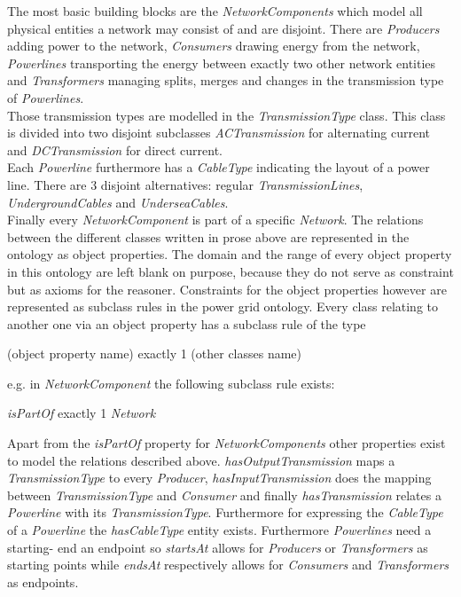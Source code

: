 The most basic building blocks are the \textit{NetworkComponents} which model all physical entities 
a network may consist of and are disjoint. There are \textit{Producers} adding power to the network, \textit{Consumers} drawing energy from the network, \textit{Powerlines} transporting the energy between exactly two other network entities and \textit{Transformers} managing splits, merges and changes in the transmission type of \textit{Powerlines}. \\
Those transmission types are modelled in the \textit{TransmissionType} class. This class is divided into two disjoint subclasses \textit{ACTransmission} for alternating current and \textit{DCTransmission} for direct current. \\
Each \textit{Powerline} furthermore has a \textit{CableType} indicating the layout of a power line. There are 3 disjoint alternatives: regular \textit{TransmissionLines}, \textit{UndergroundCables} and \textit{UnderseaCables}. \\
Finally every \textit{NetworkComponent} is part of a specific \textit{Network}.
The relations between the different classes written in prose above are represented in the ontology
as object properties. The domain and the range of every object property in this ontology are left blank on purpose, because they do not serve as constraint but as axioms for the reasoner. Constraints
for the object properties however are represented as subclass rules in the power grid ontology.
Every class relating to another one via an object property has a subclass rule of the type 
\begin{center}
(object property name) exactly 1 (other classes name)
\end{center}
e.g. in \textit{NetworkComponent} the following subclass rule exists:
\begin{center}
\textit{isPartOf} exactly 1 \textit{Network}
\end{center}
Apart from the \textit{isPartOf} property for \textit{NetworkComponents} other properties exist to model the relations described above. \textit{hasOutputTransmission} maps a \textit{TransmissionType} to every \textit{Producer}, \textit{hasInputTransmission} does the mapping between \textit{TransmissionType} and \textit{Consumer} and finally \textit{hasTransmission} relates a \textit{Powerline} with its \textit{TransmissionType}. Furthermore for expressing the \textit{CableType} of a \textit{Powerline} the \textit{hasCableType} entity exists. Furthermore \textit{Powerlines} need a starting- end an endpoint so \textit{startsAt} allows for \textit{Producers} or \textit{Transformers} as starting points while \textit{endsAt} respectively allows for \textit{Consumers} and \textit{Transformers} as endpoints. \\
